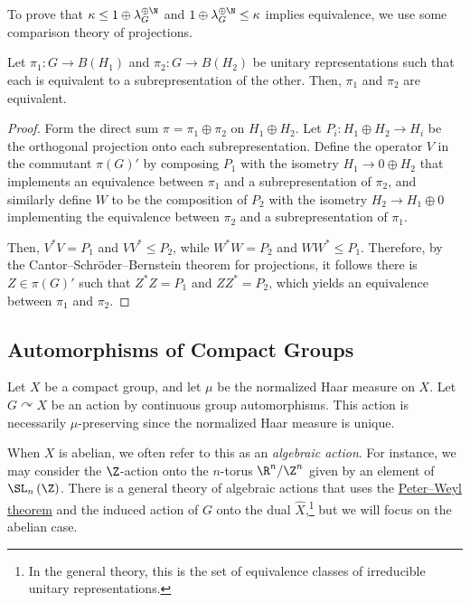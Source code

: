 \documentclass[10pt]{mypackage}
\begin{document}
To prove that $\kappa\leq 1\oplus \lambda_G^{\oplus \N}$ and $1\oplus \lambda_G^{\oplus \N}\leq \kappa$ implies equivalence, we use some comparison theory of projections.
\begin{proposition}
  Let $\pi_1\colon G\rightarrow B\left( H_1 \right)$ and $\pi_2\colon G\rightarrow B\left( H_2 \right)$ be unitary representations such that each is equivalent to a subrepresentation of the other. Then, $\pi_1$ and $\pi_2$ are equivalent.
\end{proposition}
\begin{proof}
  Form the direct sum $\pi = \pi_1\oplus \pi_2$ on $H_1\oplus H_2$. Let $P_i\colon H_1\oplus H_2\rightarrow H_i$ be the orthogonal projection onto each subrepresentation. Define the operator $V$ in the commutant $\pi\left( G \right)'$ by composing $P_1$ with the isometry $H_1\rightarrow 0\oplus H_2$ that implements an equivalence between $\pi_1$ and a subrepresentation of $\pi_2$, and similarly define $W$ to be the composition of $P_2$ with the isometry $H_2\rightarrow H_1\oplus 0$ implementing the equivalence between $\pi_2$ and a subrepresentation of $\pi_1$. 

  Then, $V^{\ast}V = P_1$ and $VV^{\ast}\leq P_2$, while $W^{\ast}W = P_2$ and $WW^{\ast} \leq P_1$. Therefore, by the Cantor--Schröder--Bernstein theorem for projections, it follows there is $Z\in \pi\left( G \right)'$ such that $Z^{\ast}Z = P_1$ and $ZZ^{\ast} = P_2$, which yields an equivalence between $\pi_1$ and $\pi_2$.
\end{proof}
\subsection{Automorphisms of Compact Groups}%
Let $X$ be a compact group, and let $\mu$ be the normalized Haar measure on $X$. Let $G\curvearrowright X$ be an action by continuous group automorphisms. This action is necessarily $\mu$-preserving since the normalized Haar measure is unique.

When $X$ is abelian, we often refer to this as an \textit{algebraic action}. For instance, we may consider the $\Z$-action onto the $n$-torus $\R^n/\Z^n$ given by an element of $\SL_n\left( \Z \right)$. There is a general theory of algebraic actions that uses the \href{https://terrytao.wordpress.com/2011/09/27/254a-notes-3-haar-measure-and-the-peter-weyl-theorem/}{Peter--Weyl theorem} and the induced action of $G$ onto the dual $ \widehat{X} $,\footnote{In the general theory, this is the set of equivalence classes of irreducible unitary representations.} but we will focus on the abelian case.
\end{document}
